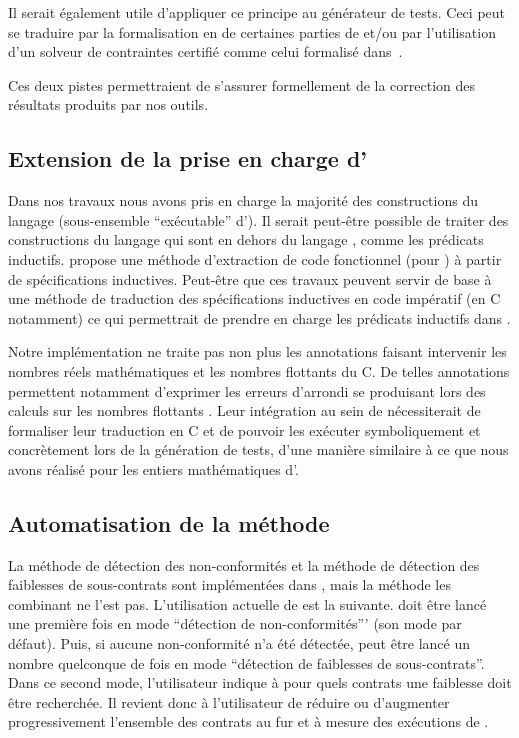 Il serait également utile d'appliquer ce principe au générateur de tests.
Ceci peut se traduire par la formalisation en \coq de certaines parties de
\pathcrawler et/ou par l'utilisation d'un solveur de contraintes certifié comme
celui formalisé dans~\cite{Carlier/FM12}.

Ces deux pistes permettraient de s'assurer formellement de la correction
des résultats produits par nos outils.


\subsection{Extension de la prise en charge d'\acsl}


Dans nos travaux nous avons pris en charge la majorité des constructions du
langage \eacsl (sous-ensemble ``exécutable'' d'\acsl).
Il serait peut-être possible de traiter des constructions du langage \acsl qui
sont en dehors du langage \eacsl, comme les prédicats inductifs.
\cite{Tollitte/CPP12} propose une méthode d'extraction de code fonctionnel
(pour \coq) à partir de spécifications inductives.
Peut-être que ces travaux peuvent servir de base à une méthode de traduction
des spécifications inductives en code impératif (en C notamment) ce qui
permettrait de prendre en charge les prédicats inductifs dans \stady.

Notre implémentation ne traite pas non plus les annotations faisant intervenir
les nombres réels mathématiques et les nombres flottants du C.
De telles annotations permettent notamment d'exprimer les erreurs d'arrondi
se produisant lors des calculs sur les nombres flottants
\cite{Goubault/VMCAI11}.
Leur intégration au sein de \stady nécessiterait de formaliser leur traduction
en C et de pouvoir les exécuter symboliquement et concrètement lors de la
génération de tests, d'une manière similaire à ce que nous avons réalisé pour
les entiers mathématiques d'\eacsl.


\subsection{Automatisation de la méthode}


La méthode de détection des non-conformités et la méthode de détection des
faiblesses de sous-contrats sont implémentées dans \stady, mais la méthode les
combinant ne l'est pas.
L'utilisation actuelle de \stady est la suivante.
\stady doit être lancé une première fois en mode
``détection de non-conformités''' (son mode par défaut).
Puis, si aucune non-conformité n'a été détectée, \stady peut être lancé un
nombre quelconque de fois en mode ``détection de faiblesses de sous-contrats''.
Dans ce second mode, l'utilisateur indique à \stady pour quels contrats une
faiblesse doit être recherchée.
Il revient donc à l'utilisateur de réduire ou d'augmenter progressivement
l'ensemble des contrats au fur et à mesure des exécutions de \stady.

